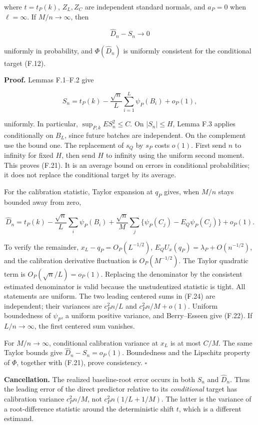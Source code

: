 where \(t=t_P(k)\), \(Z_L,Z_C\) are independent standard normals, and
\(a_P=0\) when \(\ell=\infty\). If \(M/n\to\infty\), then

\[
\widehat D_n-S_n\longrightarrow0
\]

uniformly in probability, and \(\Phi(\widehat D_n)\) is uniformly
consistent for the conditional target (F.12).

\textbf{Proof.} Lemmas F.1--F.2 give

\[
S_n
=t_P(k)-\frac{\sqrt n}{L}\sum_{i=1}^{L}\psi_P(B_i)+o_P(1),
\tag{F.23}
\]

uniformly. In particular, \(\sup_{P,k}E S_n^2\le C\). On \(|S_n|\le H\),
Lemma F.3 applies conditionally on \(B_L\), since future batches are
independent. On the complement use the bound one. The replacement of
\(s_Q\) by \(s_P\) costs \(o(1)\). First send \(n\) to infinity for
fixed \(H\), then send \(H\) to infinity using the uniform second
moment. This proves (F.21). It is an average bound on errors in
conditional probabilities; it does not replace the conditional target by
its average.

For the calibration statistic, Taylor expansion at \(q_P\) gives, when
\(M/n\) stays bounded away from zero,

\[
\widehat D_n
=t_P(k)-\frac{\sqrt n}{L}\sum_i\psi_P(B_i)
 +\frac{\sqrt n}{M}\sum_j
 \{\psi_P(C_j)-E_Q\psi_P(C_j)\}
 +o_P(1).
\tag{F.24}
\]

To verify the remainder, \(x_L-q_P=O_P(L^{-1/2})\),
\(E_QU_x(q_P)=\lambda_P+O(n^{-1/2})\), and the calibration derivative
fluctuation is \(O_P(M^{-1/2})\). The Taylor quadratic term is
\(O_P(\sqrt n/L)=o_P(1)\). Replacing the denominator by the consistent
estimated denominator is valid because the unstudentized statistic is
tight. All statements are uniform. The two leading centered sums in
(F.24) are independent; their variances are \(c_P^2n/L\) and
\(c_P^2n/M+o(1)\). Uniform boundedness of \(\psi_P\), a uniform positive
variance, and Berry--Esseen give (F.22). If \(L/n\to\infty\), the first
centered sum vanishes.

For \(M/n\to\infty\), conditional calibration variance at \(x_L\) is at
most \(C/M\). The same Taylor bounds give \(\widehat D_n-S_n=o_P(1)\).
Boundedness and the Lipschitz property of \(\Phi\), together with
(F.21), prove consistency. \(\square\)

\textbf{Cancellation.} The realized baseline-root error occurs in both
\(S_n\) and \(\widehat D_n\). Thus the leading error of the direct
predictor relative to its \emph{conditional} target has calibration
variance \(c_P^2n/M\), not \(c_P^2n(1/L+1/M)\). The latter is the
variance of a root-difference statistic around the deterministic shift
\(t\), which is a different estimand.

